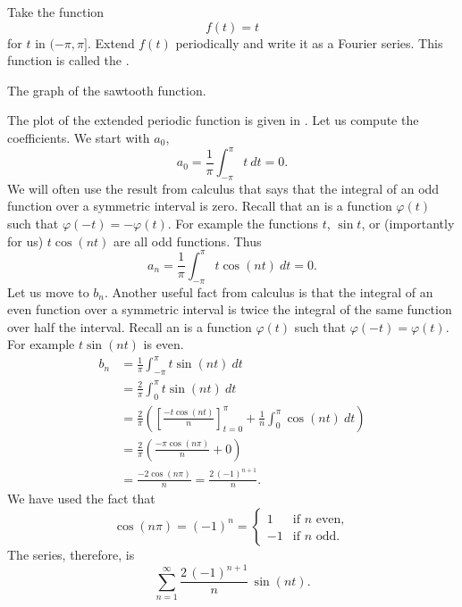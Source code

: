 \begin{example}
Take the function
\begin{equation*}
f(t) = t
\end{equation*}
for $t$ in $(-\pi,\pi]$.  Extend $f(t)$ periodically and write it 
as a Fourier series.  This function is called the \emph{}.

\begin{myfig}
\capstart
{}
\caption{The graph of the sawtooth function.\label{ts:sawtoothfig}}
\end{myfig}

The plot of the extended periodic function is given in
.
Let us compute the coefficients.  We start with $a_0$,
\begin{equation*}
a_0 = \frac{1}{\pi} \int_{-\pi}^\pi t ~dt = 0 .
\end{equation*}
We will often use the result from calculus that says that the integral of an odd
function over a symmetric interval is zero.  Recall that an
\emph{} is a
function $\varphi(t)$ such that $\varphi(-t) = -\varphi(t)$.  For example
the functions $t$, $\sin t$, or (importantly for us)
$t \cos (nt)$ are all odd functions.  Thus
\begin{equation*}
a_n = \frac{1}{\pi} \int_{-\pi}^\pi t \cos (nt) ~dt = 0 .
\end{equation*}
Let us move to $b_n$.  Another useful fact from calculus
is that the integral of an even function over
a symmetric interval is
twice the integral of the same function over half the interval.  
Recall an \emph{}
is a
function $\varphi(t)$ such that $\varphi(-t) = \varphi(t)$.  For example
$t \sin (nt)$ is even.
\begin{equation*}
\begin{split}
b_n & = \frac{1}{\pi} \int_{-\pi}^\pi t \sin (nt) ~dt \\
& = \frac{2}{\pi} \int_{0}^\pi t \sin (nt) ~dt \\
& = \frac{2}{\pi} \left(
\left[ \frac{-t \cos (nt)}{n} \right]_{t=0}^{\pi}
+
\frac{1}{n}
\int_{0}^\pi \cos (nt) ~dt
\right)
\\
& = \frac{2}{\pi} \left(
\frac{-\pi \cos (n\pi)}{n}
+
0
\right) \\
& =  \frac{-2 \cos (n\pi)}{n}
=  \frac{2 \,{(-1)}^{n+1}}{n} .
\end{split}
\end{equation*}
We have used the fact that 
\begin{equation*}
\cos (n\pi) = {(-1)}^n =
\begin{cases}
1 & \text{if } n \text{ even} , \\
-1 & \text{if } n \text{ odd} .
\end{cases}
\end{equation*}
The series, therefore, is
\begin{equation*}
\sum_{n=1}^\infty
\frac{2 \,{(-1)}^{n+1}}{n} \,
\sin (n t) .
\end{equation*}


\end{example}
